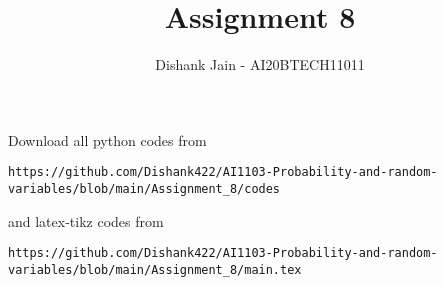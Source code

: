\documentclass[journal,12pt,twocolumn]{IEEEtran}
\DeclareMathOperator*{\Res}{Res}
\begin{document}
\newcommand{\BEQA}{\begin{eqnarray}}
\newcommand{\EEQA}{\end{eqnarray}}
\newcommand{\define}{\stackrel{\triangle}{=}}

\raggedbottom
\setlength{\parindent}{0pt}
\providecommand{\mbf}{\mathbf}
\providecommand{\pr}[1]{\ensuremath{\Pr\left(#1\right)}}
\providecommand{\qfunc}[1]{\ensuremath{Q\left(#1\right)}}
\providecommand{\sbrak}[1]{\ensuremath{{}\left[#1\right]}}
\providecommand{\lsbrak}[1]{\ensuremath{{}\left[#1\right.}}
\providecommand{\rsbrak}[1]{\ensuremath{{}\left.#1\right]}}
\providecommand{\brak}[1]{\ensuremath{\left(#1\right)}}
\providecommand{\lbrak}[1]{\ensuremath{\left(#1\right.}}
\providecommand{\rbrak}[1]{\ensuremath{\left.#1\right)}}
\providecommand{\cbrak}[1]{\ensuremath{\left\{#1\right\}}}
\providecommand{\lcbrak}[1]{\ensuremath{\left\{#1\right.}}
\providecommand{\rcbrak}[1]{\ensuremath{\left.#1\right\}}}
\theoremstyle{remark}
\newtheorem{rem}{Remark}
\newcommand{\sgn}{\mathop{\mathrm{sgn}}}
\providecommand{\abs}[1]{\vert#1\vert}
\providecommand{\res}[1]{\Res\displaylimits_{#1}} 
\providecommand{\norm}[1]{\lVert#1\rVert}
\providecommand{\mtx}[1]{\mathbf{#1}}
\providecommand{\mean}[1]{E[ #1 ]}
\providecommand{\fourier}{\overset{\mathcal{F}}{ \rightleftharpoons}}
\providecommand{\system}{\overset{\mathcal{H}}{ \longleftrightarrow}}
\newcommand{\solution}{\noindent \textbf{Solution: }}
\newcommand{\cosec}{\,\text{cosec}\,}
\providecommand{\dec}[2]{\ensuremath{\overset{#1}{\underset{#2}{\gtrless}}}}
\newcommand{\myvec}[1]{\ensuremath{\begin{pmatrix}#1\end{pmatrix}}}
\newcommand{\mydet}[1]{\ensuremath{\begin{vmatrix}#1\end{vmatrix}}}
\makeatletter
{}
\makeatother
\let\StandardTheFigure\thefigure
\let\vec\mathbf
\renewcommand{\thefigure}{\theproblem}
\def\putbox#1#2#3{\makebox[0in][l]{\makebox[#1][l]{}\raisebox{\baselineskip}[0in][0in]{\raisebox{#2}[0in][0in]{#3}}}}
     \def\rightbox#1{\makebox[0in][r]{#1}}
     \def\centbox#1{\makebox[0in]{#1}}
     \def\topbox#1{\raisebox{-\baselineskip}[0in][0in]{#1}}
     \def\midbox#1{\raisebox{-0.5\baselineskip}[0in][0in]{#1}}
\vspace{3cm}
\title{Assignment 8}
\author{Dishank Jain - AI20BTECH11011}
\maketitle
\newpage
\bigskip
\renewcommand{\thefigure}{\theenumi}
\renewcommand{\thetable}{\theenumi}
Download all python codes from 
\begin{lstlisting}
https://github.com/Dishank422/AI1103-Probability-and-random-variables/blob/main/Assignment_8/codes
\end{lstlisting}
%
and latex-tikz codes from 
%
\begin{lstlisting}
https://github.com/Dishank422/AI1103-Probability-and-random-variables/blob/main/Assignment_8/main.tex
\end{lstlisting}
\end{document}
